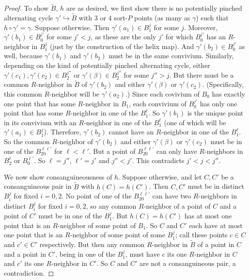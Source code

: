 \documentclass{amsart}
\theoremstyle{definition}
\theoremstyle{remark}
\numberwithin{equation}{section}
\begin{document}
\begin{proof}
 To show $\tilde{B}$, $h$ are as desired, we first show there is no potentially pinched alternating cycle $\gamma' \hookrightarrow \tilde{B}$ with $3$ or $4$ sort-$P$ points (as many as $\gamma$) such that $h \circ \gamma' = \gamma$. Suppose otherwise. Then $\gamma'(a_1) \in B^{j}_{1}$ for some $j$. Moreover, $\gamma'(b_1) \in B^{j'}_{0}$ for some $j' < j$, as these are the only $j'$ for which $B^{j'}_{0}$ has an $R$-neighbor in $B_{1}^{j}$ (just by the construction of the helix map). And $\gamma'(b_2) \in B^{j'}_{0}$ as well, because $\gamma'(b_1)$ and $\gamma'(b_2)$ must be in the same convivium. Similarly, depending on the kind of potentially pinched alternating cycle, either $\gamma'(c_1), \gamma'(c_{2}) \in B^{j''}_{2}$ or $\gamma'(\beta) \in B^{j''}_{2}$ for some $j'' > j$. But there must be a common $R$-neighbor in $\tilde{B}$ of $\gamma'(b_2)$ and either $\gamma'(\beta)$ or $\gamma'(c_{2})$. (Specifically, this common $R$-neighbor will be $\gamma'(a_{2})$.) Since each covivium of $B_0$ has exactly one point that has some $R$-neighbor in $B_1$, each convivium of $B^{j'}_{0}$ has only one point that has some $R$-neighbor in one of the $B^{\ell}_{1}$. So $\gamma'(b_1)$ is the unique point in its convivium with an $R$-neighbor in one of the $B^{\ell}_{1}$ (one of which will be $\gamma'(a_{1}) \in B_{1}^{j}$). Therefore, $\gamma'(b_2)$ cannot have an $R$-neighbor in one of the $B^{\ell}_{1}$. So the common $R$-neighbor of $\gamma'(b_2)$ and either $\gamma'(\beta)$ or $\gamma'(c_{2})$ must be in one of the $B^{\ell\ell'}_{20}$ for $ \ell < \ell'$.  But a point of $B^{\ell\ell'}_{20}$ can only have $R$-neighbors in $B^{\ell}_{2}$ or $B^{\ell'}_{0}$. So $\ell = j''$, $\ell' = j'$ and $j'' < j'$. This contradicts $j' < j < j''$.

 We now show consanguineousness of $h$. Suppose otherwise, and let $C, C'$ be a consanguineous pair in $\tilde{B}$ with $h(C) = h(C')$. Then $C, C'$ must be in distinct $B_{i}^{j}$ for fixed $i = 0, 2$. No point of one of the $B^{\ell\ell'}_{20}$ can have two $R$-neighbors in distinct $B_{i}^{j}$ for fixed $i = 0, 2$, so any common $R$-neighbor of a point of $C$ and a point of $C'$ must be in one of the $B^{j}_{1}$.  But $h(C) = h(C')$ has at most one point that is an $R$-neighbor of some point of $B_1$. So $C$ and $C'$ each have at most one point that is an $R$-neighbor of some point of some $B^{j}_{1}$;  call these points $c \in C$ and $c' \in C'$ respectively. But then any common $R$-neighbor in $\tilde{B}$ of a point in $C$ and a point in $C'$, being in one of the $B^{j}_{1}$, must have $c$ its one $R$-neighbor in $C$ and $c'$ its one $R$-neighbor in $C'$. So $C$ and $C'$ are not a consanguineous pair, a contradiction.

    
\end{proof}
\end{document}
